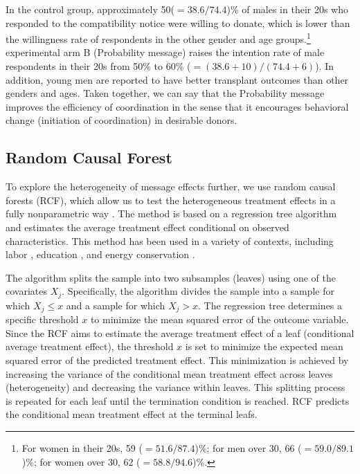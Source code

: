 \documentclass[
]{article}
\begin{document}
In the control group, approximately 50(\(=38.6/74.4\))\% of males in their 20s who responded to the compatibility notice were willing to donate, which is lower than the willingness rate of respondents in the other gender and age groups.\footnote{For women in their 20s, 59 (\(=51.6/87.4\))\%; for men over 30, 66 (\(=59.0/89.1\))\%; for women over 30, 62 (\(=58.8/94.6\))\%.} experimental arm B (Probability message) raises the intention rate of male respondents in their 20s from 50\% to 60\% (\(=(38.6 + 10)/(74.4 + 6)\)). In addition, young men are reported to have better transplant outcomes than other genders and ages. Taken together, we can say that the Probability message improves the efficiency of coordination in the sense that it encourages behavioral change (initiation of coordination) in desirable donors.

\hypertarget{rcf}{%
\subsection{Random Causal Forest}\label{rcf}}

To explore the heterogeneity of message effects further, we use random causal forests (RCF), which allow us to test the heterogeneous treatment effects in a fully nonparametric way \citep{Athey2016, Wager2018}. The method is based on a regression tree algorithm and estimates the average treatment effect conditional on observed characteristics. This method has been used in a variety of contexts, including labor \citep{Davis2017}, education \citep{Carlana2022}, and energy conservation \citep{Murakami2022}.

The algorithm splits the sample into two subsamples (leaves) using one of the covariates \(X_j\). Specifically, the algorithm divides the sample into a sample for which \(X_j \le x\) and a sample for which \(X_j > x\). The regression tree determines a specific threshold \(x\) to minimize the mean squared error of the outcome variable. Since the RCF aims to estimate the average treatment effect of a leaf (conditional average treatment effect), the threshold \(x\) is set to minimize the expected mean squared error of the predicted treatment effect. This minimization is achieved by increasing the variance of the conditional mean treatment effect across leaves (heterogeneity) and decreasing the variance within leaves. This splitting process is repeated for each leaf until the termination condition is reached. RCF predicts the conditional mean treatment effect at the terminal leafs.
\end{document}

